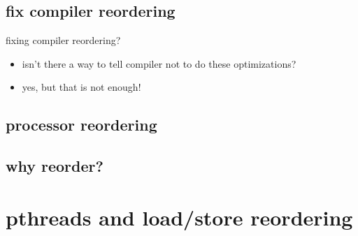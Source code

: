 \subsection{fix compiler reordering}
\begin{frame}{fixing compiler reordering?}
    \begin{itemize}
    \item isn't there a way to tell compiler not to do these optimizations?
    \item yes, but that is not enough!
    \end{itemize}
\end{frame}

\subsection{processor reordering}


\subsection{why reorder?}





\section{pthreads and load/store reordering}


